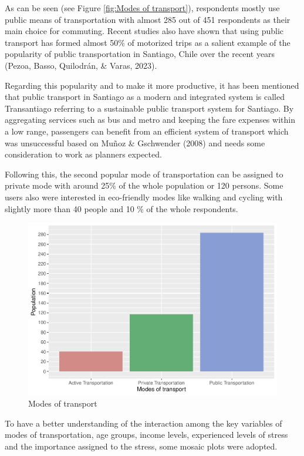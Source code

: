 \documentclass[
11pt, %
oneside, %
english, %
singlespacing, %
]{macthesis} %
\begin{document}
As can be seen (see Figure \ref{fig:Modes of transport}), respondents mostly use public means of transportation with almost 285 out of 451 respondents as their main choice for commuting. Recent studies also have shown that using public transport has formed almost 50\% of motorized trips as a salient example of the popularity of public transportation in Santiago, Chile over the recent years (Pezoa, Basso, Quilodrán, \& Varas, 2023).

Regarding this popularity and to make it more productive, it has been mentioned that public transport in Santiago as a modern and integrated system is called Transantiago referring to a sustainable public transport system for Santiago. By aggregating services such as bus and metro and keeping the fare expenses within a low range, passengers can benefit from an efficient system of transport which was unsuccessful based on Muñoz \& Gschwender (2008) and needs some consideration to work as planners expected.

Following this, the second popular mode of transportation can be assigned to private mode with around 25\% of the whole population or 120 persons. Some users also were interested in eco-friendly modes like walking and cycling with slightly more than 40 people and 10 \% of the whole respondents.
\begin{figure}

{\centering \includegraphics[width=0.85\linewidth]{thesis_files/figure-latex/unnamed-chunk-22-1} 

}

\caption{\label{fig:Modes of transport}Modes of transport}\label{fig:unnamed-chunk-22}
\end{figure}
To have a better understanding of the interaction among the key variables of modes of transportation, age groups, income levels, experienced levels of stress and the importance assigned to the stress, some mosaic plots were adopted.
\end{document}
